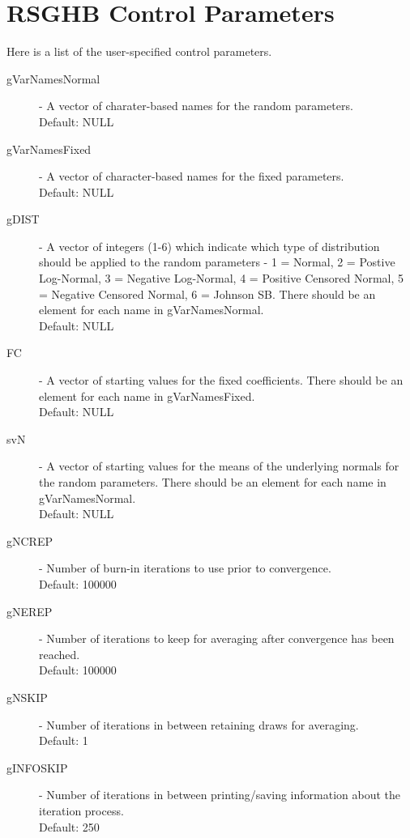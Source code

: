 \documentclass{article}
\begin{document}
\section*{RSGHB Control Parameters}

Here is a list of the user-specified control parameters.

\begin{description}

\item[gVarNamesNormal] - A vector of charater-based names for the random parameters. \\
Default: NULL

\item[gVarNamesFixed] - A vector of character-based names for the fixed parameters.\\
Default: NULL

\item[gDIST] -  A vector of integers (1-6) which indicate which type of distribution should be applied to the random parameters - 1 = Normal, 2 = Postive Log-Normal, 3 = Negative Log-Normal, 4 = Positive Censored Normal, 5 = Negative Censored Normal, 6 = Johnson SB. There should be an element for each name in gVarNamesNormal. \\ Default: NULL

\item[FC] - A vector of starting values for the fixed coefficients. There should be an element for each name in gVarNamesFixed.\\ 
Default: NULL

\item[svN] - A vector of starting values for the means of the underlying normals for the random parameters. There should be an element for each name in gVarNamesNormal.\\ Default: NULL

\item[gNCREP] - Number of burn-in iterations to use prior to convergence.\\ 
Default: 100000

\item[gNEREP] - Number of iterations to keep for averaging after convergence has been reached.\\ Default: 100000

\item[gNSKIP] - Number of iterations in between retaining draws for averaging.\\ 
Default: 1

\item[gINFOSKIP] - Number of iterations in between printing/saving information about the iteration process.
\\ Default: 250


\end{description}
\end{document}
